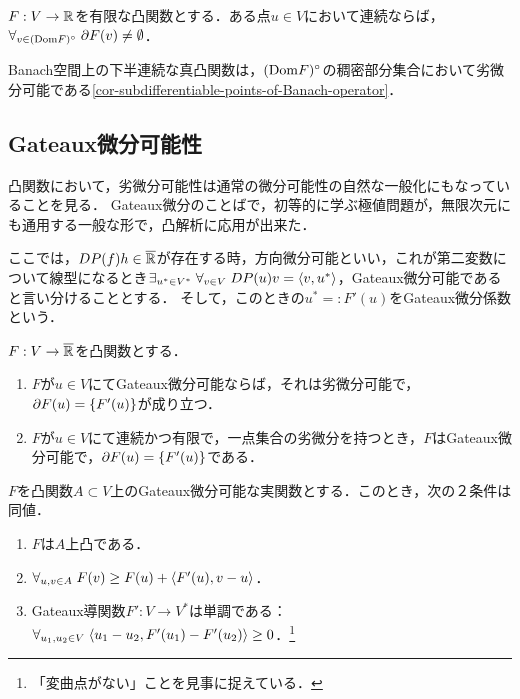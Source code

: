 \documentclass[uplatex,dvipdfmx]{jsreport}
\begin{document}
\begin{proposition}[凸関数の劣微分可能性の特徴付け]
    $F:V\to\mathbb{R}$を有限な凸関数とする．ある点$u\in V$において連続ならば，$\forall_{v\in(\mathrm{Dom} F)^\circ}\;\partial F(v)\ne\emptyset$．
\end{proposition}
\begin{remark}
    Banach空間上の下半連続な真凸関数は，$(\mathrm{Dom} F)^\circ$の稠密部分集合において劣微分可能である\ref{cor-subdifferentiable-points-of-Banach-operator}．
\end{remark}

\subsection{Gateaux微分可能性}

\begin{tcolorbox}[colframe=ForestGreen, colback=ForestGreen!10!white,breakable,colbacktitle=ForestGreen!40!white,coltitle=black,fonttitle=\bfseries\sffamily,
title=]
    凸関数において，劣微分可能性は通常の微分可能性の自然な一般化にもなっていることを見る．
    Gateaux微分のことばで，初等的に学ぶ極値問題が，無限次元にも通用する一般な形で，凸解析に応用が出来た．
\end{tcolorbox}

\begin{definition}
    ここでは，$DP(f)h\in\overline{\mathbb{R}}$が存在する時，方向微分可能といい，これが第二変数について線型になるとき$\exists_{u^*\in V^*}\;\forall_{v\in V}\;DP(u)v=\langle v,u^*\rangle$，Gateaux微分可能であると言い分けることとする．
    そして，このときの$u^*=:F'(u)$をGateaux微分係数という．
\end{definition}

\begin{proposition}[Gateaux微分と劣微分の関係]
    $F:V\to\overline{\mathbb{R}}$を凸関数とする．
    \begin{enumerate}
        \item $F$が$u\in V$にてGateaux微分可能ならば，それは劣微分可能で，$\partial F(u)=\left\{F'(u)\right\}$が成り立つ．
        \item $F$が$u\in V$にて連続かつ有限で，一点集合の劣微分を持つとき，$F$はGateaux微分可能で，$\partial F(u)=\left\{F'(u)\right\}$である．
    \end{enumerate}
\end{proposition}

\begin{proposition}[Gateaux微分可能な関数が凸であることの特徴付け]
    $F$を凸関数$A\subset V$上のGateaux微分可能な実関数とする．このとき，次の２条件は同値．
    \begin{enumerate}
        \item $F$は$A$上凸である．
        \item $\forall_{u,v\in A}\;F(v)\ge F(u)+\langle F'(u),v-u\rangle$．
        \item Gateaux導関数$F':V\to V^*$は単調である：$\forall_{u_1,u_2\in V}\;\langle u_1-u_2,F'(u_1)-F'(u_2)\rangle\ge0$．\footnote{「変曲点がない」ことを見事に捉えている．}
    \end{enumerate}
\end{proposition}
\end{document}
